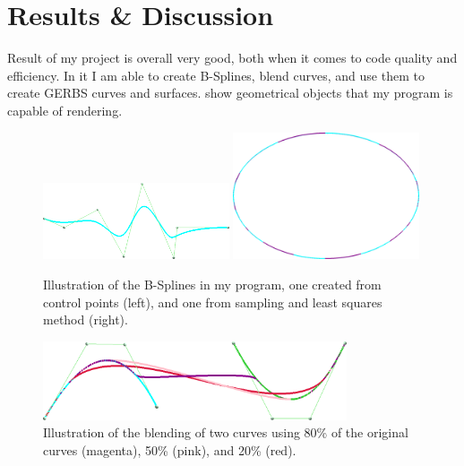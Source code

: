 \documentclass[a4paper,12pt]{extarticle}
\begin{document}
\section{Results \& Discussion}
Result of my project is overall very good, both when it comes to code quality and efficiency. In it I am able to create B-Splines, blend curves, and use them to create GERBS curves and surfaces.  show geometrical objects that my program is capable of rendering.

\begin{figure}[H]
  \centering
  \includegraphics[width=0.49\textwidth]{B-Spline.png}
  \includegraphics[width=0.49\textwidth]{Sampling.png}
  \caption{Illustration of the B-Splines in my program, one created from control points (left), and one from sampling and least squares method (right).}
  \label{fig:B-Splines}
\end{figure}

\begin{figure}[H]
  \centering
  \includegraphics[width=0.8\textwidth]{Blending.png}
  \caption{Illustration of the blending of two curves using 80\% of the original curves (magenta), 50\% (pink), and 20\% (red).}
  \label{fig:Blending}
\end{figure}
\end{document}
